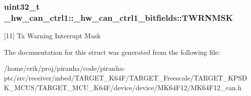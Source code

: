 \subsubsection[{\texorpdfstring{T\+W\+R\+N\+M\+SK}{TWRNMSK}}]{\setlength{\rightskip}{0pt plus 5cm}uint32\+\_\+t \+\_\+hw\+\_\+can\+\_\+ctrl1\+::\+\_\+hw\+\_\+can\+\_\+ctrl1\+\_\+bitfields\+::\+T\+W\+R\+N\+M\+SK}\hypertarget{struct__hw__can__ctrl1_1_1__hw__can__ctrl1__bitfields_a49e077dc6d5ee68d8c99434b84ec6ff6}{}\label{struct__hw__can__ctrl1_1_1__hw__can__ctrl1__bitfields_a49e077dc6d5ee68d8c99434b84ec6ff6}
\mbox{[}11\mbox{]} Tx Warning Interrupt Mask 

The documentation for this struct was generated from the following file\+:\begin{DoxyCompactItemize}
\item 
/home/erik/proj/piranha/code/piranha-\/ptc/src/receiver/mbed/\+T\+A\+R\+G\+E\+T\+\_\+\+K64\+F/\+T\+A\+R\+G\+E\+T\+\_\+\+Freescale/\+T\+A\+R\+G\+E\+T\+\_\+\+K\+P\+S\+D\+K\+\_\+\+M\+C\+U\+S/\+T\+A\+R\+G\+E\+T\+\_\+\+M\+C\+U\+\_\+\+K64\+F/device/device/\+M\+K64\+F12/M\+K64\+F12\+\_\+can.\+h\end{DoxyCompactItemize}
